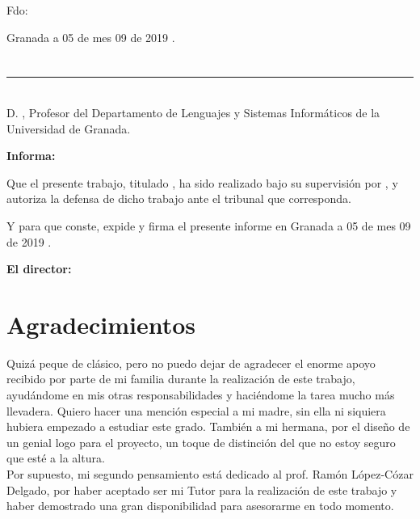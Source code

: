 \vspace{6cm}

\noindent Fdo: \myName

\vspace{2cm}

\begin{flushright}
Granada a 05 de mes 09 de 2019 .
\end{flushright}


\chapter*{}
\thispagestyle{empty}

\noindent\rule[-1ex]{\textwidth}{2pt}\\[4.5ex]

D. \textbf{\myProf}, Profesor del Departamento de Lenguajes y Sistemas Informáticos de la Universidad de Granada.

\vspace{0.5cm}


\textbf{Informa:}

\vspace{0.5cm}

Que el presente trabajo, titulado \textit{\textbf{\myOfficialTitle}},
ha sido realizado bajo su supervisión por \textbf{\myName}, y autoriza la defensa de dicho trabajo ante el tribunal
que corresponda.

\vspace{0.5cm}

Y para que conste, expide y firma el presente informe en Granada a 05 de mes 09 de 2019 .

\vspace{1cm}

\textbf{El director:}

\vspace{5cm}

\noindent \textbf{\myProf}

\chapter*{Agradecimientos}
\thispagestyle{empty}

       \vspace{1cm}


Quizá peque de clásico, pero no puedo dejar de agradecer el enorme apoyo recibido por parte de mi familia durante la realización de este trabajo, ayudándome en mis otras responsabilidades y haciéndome la tarea mucho más llevadera. Quiero hacer una mención especial a mi madre, sin ella ni siquiera hubiera empezado a estudiar este grado. También a mi hermana, por el diseño de un genial logo para el proyecto, un toque de distinción del que no estoy seguro que esté a la altura.\\

Por supuesto, mi segundo pensamiento está dedicado al prof. Ramón López-Cózar Delgado, por haber aceptado ser mi Tutor para la realización de este trabajo y haber demostrado una gran disponibilidad para asesorarme en todo momento.\\



